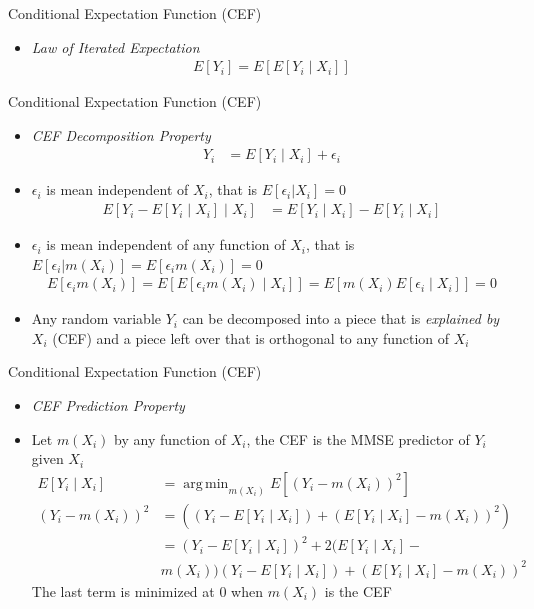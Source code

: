 \documentclass[aspectratio=1610,12pt,xcolor=dvipsnames]{beamer}
\DeclareMathOperator*{\argmin}{arg\,min}
\begin{document}
\begin{frame}{Conditional Expectation Function (CEF)}
    \begin{itemize}
        \item \textit{Law of Iterated Expectation}
        \begin{align*}
            E[Y_i] = E[E[Y_i \mid X_i]]
        \end{align*}
    \end{itemize}
\end{frame}

\begin{frame}{Conditional Expectation Function (CEF)}

\begin{itemize}
    \item \textit{CEF Decomposition Property}
        \begin{align*}
            Y_i &= E[Y_i \mid X_i] + \epsilon_i
        \end{align*}
    \item $\epsilon_i$ is mean independent of $X_i$, that is $E[\epsilon_i | X_i]=0$
        \begin{align*}
            E[Y_i - E[Y_i \mid X_i] \mid X_i] &= E[Y_i \mid X_i] - E[Y_i \mid X_i]
        \end{align*}
        \item $\epsilon_i$ is mean independent of any function of $X_i$, that is $E[\epsilon_i | m(X_i)]=E[\epsilon_im(X_i)]=0$
        \begin{align*}
            E[\epsilon_im(X_i)] = E[E[\epsilon_im(X_i) \mid X_i]] = E[m(X_i) E[\epsilon_i \mid X_i]] = 0
        \end{align*}
        \item Any random variable $Y_i$ can be decomposed into a piece that is \textit{explained by } $X_i$ (CEF) and a piece left over that is orthogonal to any function of $X_i$
\end{itemize}
\end{frame}

\begin{frame}{Conditional Expectation Function (CEF)}

\begin{itemize}
    \item \textit{CEF Prediction Property}
    \item Let $m(X_i)$ by any function of $X_i$, the CEF is the MMSE predictor of $Y_i$ given $X_i$
    \begin{align*}
        E[Y_i \mid X_i] &= \argmin_{m(X_i)} E[(Y_i - m(X_i))^2]
        \\ (Y_i - m(X_i))^2&= ((Y_i - E[Y_i \mid X_i]) + ( E[Y_i \mid X_i] -m(X_i))^2) \\
        &= (Y_i - E[Y_i \mid X_i])^2 + 2 ( E[Y_i \mid X_i] - \\
        & m(X_i)) (Y_i - E[Y_i \mid X_i]) + (E[Y_i \mid X_i] -m(X_i))^2
    \end{align*}
    The last term is minimized at 0 when $m(X_i)$ is the CEF
\end{itemize}
\end{frame}
\end{document}
